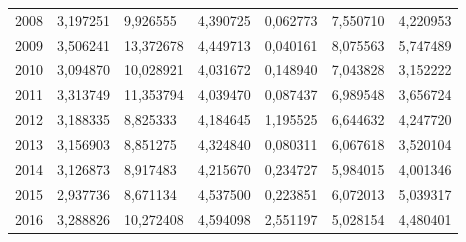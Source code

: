 \begin{table}
\begin{tabular}{p{1cm}p{2cm}p{2cm}p{2cm}p{2cm}p{2cm}p{2cm}}
 2008 &                                  3,197251 &                         9,926555 &                      4,390725 &                         0,062773 &                                      7,550710 &          4,220953 \\
 2009 &                                  3,506241 &                        13,372678 &                      4,449713 &                         0,040161 &                                      8,075563 &          5,747489 \\
 2010 &                                  3,094870 &                        10,028921 &                      4,031672 &                         0,148940 &                                      7,043828 &          3,152222 \\
 2011 &                                  3,313749 &                        11,353794 &                      4,039470 &                         0,087437 &                                      6,989548 &          3,656724 \\
 2012 &                                  3,188335 &                         8,825333 &                      4,184645 &                         1,195525 &                                      6,644632 &          4,247720 \\
 2013 &                                  3,156903 &                         8,851275 &                      4,324840 &                         0,080311 &                                      6,067618 &          3,520104 \\
 2014 &                                  3,126873 &                         8,917483 &                      4,215670 &                         0,234727 &                                      5,984015 &          4,001346 \\
 2015 &                                  2,937736 &                         8,671134 &                      4,537500 &                         0,223851 &                                      6,072013 &          5,039317 \\
 2016 &                                  3,288826 &                        10,272408 &                      4,594098 &                         2,551197 &                                      5,028154 &          4,480401 \\
\bottomrule
\end{tabular}
\end{table}
